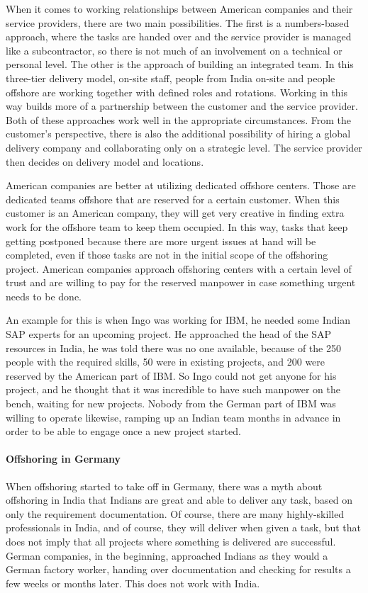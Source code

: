 When it comes to working relationships between American companies and their service providers, there are two main possibilities. The first is a numbers-based approach, where the tasks are handed over and the service provider is managed like a subcontractor, so there is not much of an involvement on a technical or personal level. The other is the approach of building an integrated team. In this three-tier delivery model, on-site staff, people from India on-site and people offshore are working together with defined roles and rotations. Working in this way builds more of a partnership between the customer and the service provider. Both of these approaches work well in the appropriate circumstances. From the customer's perspective, there is also the additional possibility of hiring a global delivery company and collaborating only on a strategic level. The service provider then decides on delivery model and locations.

American companies are better at utilizing dedicated offshore centers. Those are dedicated teams offshore that are reserved for a certain customer. When this customer is an American company, they will get very creative in finding extra work for the offshore team to keep them occupied. In this way, tasks that keep getting postponed because there are more urgent issues at hand will be completed, even if those tasks are not in the initial scope of the offshoring project. American companies approach offshoring centers with a certain level of trust and are willing to pay for the reserved manpower in case something urgent needs to be done. 

An example for this is when Ingo was working for IBM, he needed some Indian SAP experts for an upcoming project. He approached the head of the SAP resources in India, he was told there was no one available, because of the 250 people with the required skills, 50 were in existing projects, and 200 were reserved by the American part of IBM. So Ingo could not get anyone for his project, and he thought that it was incredible to have such manpower on the bench, waiting for new projects. Nobody from the German part of IBM was willing to operate likewise, ramping up an Indian team months in advance in order to be able to engage once a new project started.

\paragraph{Offshoring in Germany}
When offshoring started to take off in Germany, there was a myth about offshoring in India that Indians are great and able to deliver any task, based on only the requirement documentation. Of course, there are many highly-skilled professionals in India, and of course, they will deliver when given a task, but that does not imply that all projects where something is delivered are successful. German companies, in the beginning, approached Indians as they would a German factory worker, handing over documentation and checking for results a few weeks or months later. This does not work with India.

